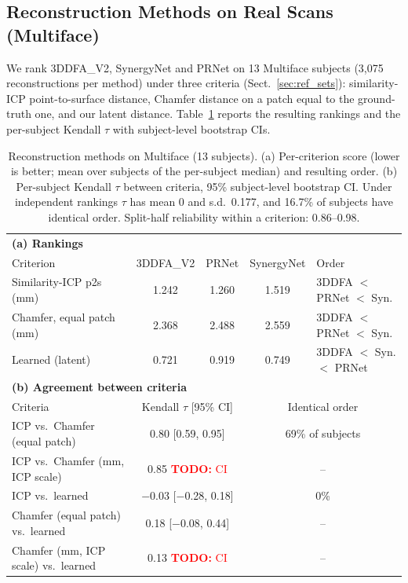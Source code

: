 \documentclass[10pt,twocolumn,letterpaper]{article}
\newcommand{\todo}[1]{\textcolor{red}{\textbf{TODO:} #1}}
\begin{document}
\subsection{Reconstruction Methods on Real Scans (Multiface)}
\label{sec:multiface_recon}
We rank 3DDFA\_V2, SynergyNet and PRNet on 13 Multiface subjects (3,075 reconstructions per method) under three criteria (Sect.~\ref{sec:ref_sets}): similarity-ICP point-to-surface distance, Chamfer distance on a patch equal to the ground-truth one, and our latent distance. Table~\ref{tab:multiface_recon} reports the resulting rankings and the per-subject Kendall $\tau$ with subject-level bootstrap CIs.

\begin{table}[!ht]
\centering
\footnotesize
\caption{Reconstruction methods on Multiface (13 subjects). (a) Per-criterion score (lower is better; mean over subjects of the per-subject median) and resulting order. (b) Per-subject Kendall $\tau$ between criteria, 95\% subject-level bootstrap CI. Under independent rankings $\tau$ has mean 0 and s.d.\ 0.177, and 16.7\% of subjects have identical order. Split-half reliability within a criterion: 0.86--0.98.}
\label{tab:multiface_recon}
\setlength{\tabcolsep}{3pt}
\begin{tabular}{lcccl}
\toprule
\multicolumn{5}{l}{\textbf{(a) Rankings}}\\
Criterion & 3DDFA\_V2 & PRNet & SynergyNet & Order \\
\midrule
Similarity-ICP p2s (mm) & 1.242 & 1.260 & 1.519 & 3DDFA $<$ PRNet $<$ Syn. \\
Chamfer, equal patch (mm) & 2.368 & 2.488 & 2.559 & 3DDFA $<$ PRNet $<$ Syn. \\
Learned (latent) & 0.721 & 0.919 & 0.749 & 3DDFA $<$ Syn. $<$ PRNet \\
\midrule
\multicolumn{5}{l}{\textbf{(b) Agreement between criteria}}\\
Criteria & \multicolumn{2}{c}{Kendall $\tau$ [95\% CI]} & \multicolumn{2}{c}{Identical order} \\
\midrule
ICP vs.\ Chamfer (equal patch) & \multicolumn{2}{c}{0.80 [0.59, 0.95]} & \multicolumn{2}{c}{69\% of subjects} \\
ICP vs.\ Chamfer (mm, ICP scale) & \multicolumn{2}{c}{0.85 \todo{CI}} & \multicolumn{2}{c}{--} \\
ICP vs.\ learned & \multicolumn{2}{c}{$-$0.03 [$-$0.28, 0.18]} & \multicolumn{2}{c}{0\%} \\
Chamfer (equal patch) vs.\ learned & \multicolumn{2}{c}{0.18 [$-$0.08, 0.44]} & \multicolumn{2}{c}{--} \\
Chamfer (mm, ICP scale) vs.\ learned & \multicolumn{2}{c}{0.13 \todo{CI}} & \multicolumn{2}{c}{--} \\
\bottomrule
\end{tabular}
\end{table}
\end{document}
